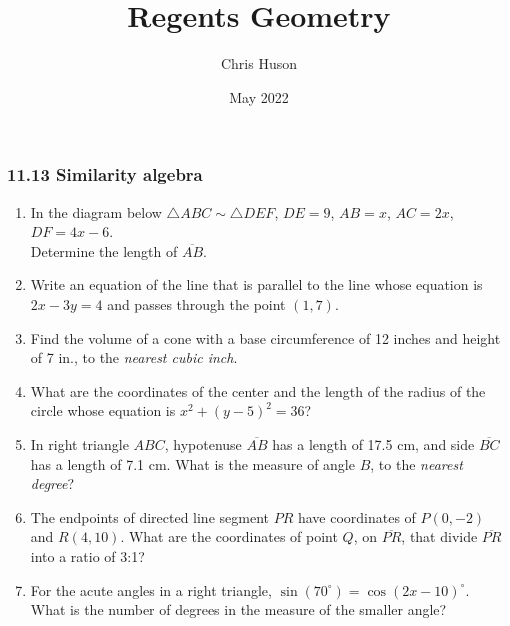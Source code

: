 \documentclass[12pt, oneside]{article}
\title{Regents Geometry}
\author{Chris Huson}
\date{May 2022}
\begin{document}
\subsubsection*{11.13 Similarity algebra}
\begin{enumerate}[itemsep=1.2cm]
  \item In the diagram below $\triangle ABC \sim \triangle DEF$, $DE=9$, $AB=x$, $AC=2x$, $DF=4x-6$. \\[0.25cm] 
  Determine the length of $\overline{AB}$.
    \begin{center}
    \end{center}

\item Write an equation of the line that is parallel to the line whose equation is $2x-3y=4$ and passes through the point $(1,7)$.
  
\item Find the volume of a cone with a base circumference of 12 inches and height of 7 in., to the \emph{nearest cubic inch}.

\item What are the coordinates of the center and the length of the radius of the circle whose equation is $x^2+(y-5)^2=36$?

\item In right triangle $ABC$, hypotenuse $\overline{AB}$ has a length of 17.5 cm, and side $\overline{BC}$ has a length of 7.1 cm. What is the measure of angle $B$, to the \emph{nearest degree}?

\item The endpoints of directed line segment $PR$ have coordinates of
$P(0,-2)$ and $R(4,10)$. What are the coordinates of point $Q$, on $\overline{PR}$, that divide $\overline{PR}$ into a ratio of 3:1?

\item For the acute angles in a right triangle, $\sin (70^\circ) =\cos (2x -10)^\circ$. \\
What is the number of degrees in the measure of the smaller angle?


\end{enumerate}
\end{document}
